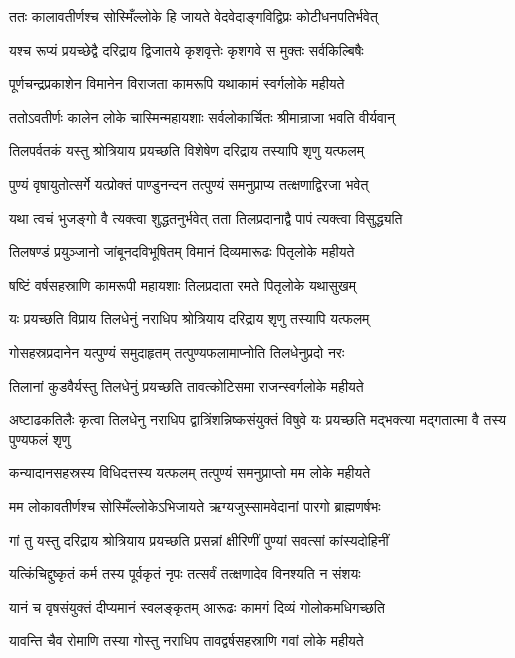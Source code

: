 \twolineshloka
{ततः कालावतीर्णश्च सोस्मिँल्लोके हि जायते}
{वेदवेदाङ्गविद्विप्रः कोटीधनपतिर्भवेत्}


\twolineshloka
{यश्च रूप्यं प्रयच्छेद्वै दरिद्राय द्विजातये}
{कृशवृत्तेः कृशगवे स मुक्तः सर्वकिल्बिषैः}


\twolineshloka
{पूर्णचन्द्रप्रकाशेन विमानेन विराजता}
{कामरूपि यथाकामं स्वर्गलोके महीयते}


\twolineshloka
{ततोऽवतीर्णः कालेन लोके चास्मिन्महायशाः}
{सर्वलोकार्चितः श्रीमान्राजा भवति वीर्यवान्}


\twolineshloka
{तिलपर्वतकं यस्तु श्रोत्रियाय प्रयच्छति}
{विशेषेण दरिद्राय तस्यापि शृणु यत्फलम्}


\twolineshloka
{पुण्यं वृषायुतोत्सर्गे यत्प्रोक्तं पाण्डुनन्दन}
{तत्पुण्यं समनुप्राप्य तत्क्षणाद्विरजा भवेत्}


\twolineshloka
{यथा त्वचं भुजङ्गो वै त्यक्त्वा शुद्धतनुर्भवेत्}
{तता तिलप्रदानाद्वै पापं त्यक्त्वा विसुद्ध्यति}


\twolineshloka
{तिलषण्डं प्रयुञ्जानो जांबूनदविभूषितम्}
{विमानं दिव्यमारूढः पितृलोके महीयते}


\twolineshloka
{षष्टिं वर्षसहस्राणि कामरूपी महायशाः}
{तिलप्रदाता रमते पितृलोके यथासुखम्}


\twolineshloka
{यः प्रयच्छति विप्राय तिलधेनुं नराधिप}
{श्रोत्रियाय दरिद्राय शृणु तस्यापि यत्फलम्}


\twolineshloka
{गोसहस्रप्रदानेन यत्पुण्यं समुदाहृतम्}
{तत्पुण्यफलामाप्नोति तिलधेनुप्रदो नरः}


\twolineshloka
{तिलानां कुडवैर्यस्तु तिलधेनुं प्रयच्छति}
{तावत्कोटिसमा राजन्स्वर्गलोके महीयते}


\threelineshloka
{अष्टाढकतिलैः कृत्वा तिलधेनु नराधिप}
{द्वात्रिंशन्निष्कसंयुक्तं विषुवे यः प्रयच्छति}
{मद्भक्त्या मद्गतात्मा वै तस्य पुण्यफलं शृणु}


\twolineshloka
{कन्यादानसहस्रस्य विधिदत्तस्य यत्फलम्}
{तत्पुण्यं समनुप्राप्तो मम लोके महीयते}


\twolineshloka
{मम लोकावतीर्णश्च सोस्मिँल्लोकेऽभिजायते}
{ऋग्यजुस्सामवेदानां पारगो ब्राह्मणर्षभः}


\twolineshloka
{गां तु यस्तु दरिद्राय श्रोत्रियाय प्रयच्छति}
{प्रसन्नां क्षीरिणीं पुण्यां सवत्सां कांस्यदोहिनीं}


\twolineshloka
{यत्किंचिद्दुष्कृतं कर्म तस्य पूर्वकृतं नृपः}
{तत्सर्वं तत्क्षणादेव विनश्यति न संशयः}


\twolineshloka
{यानं च वृषसंयुक्तं दीप्यमानं स्वलङ्कृतम्}
{आरूढः कामगं दिव्यं गोलोकमधिगच्छति}


\twolineshloka
{यावन्ति चैव रोमाणि तस्या गोस्तु नराधिप}
{तावद्वर्षसहस्राणि गवां लोके महीयते}


